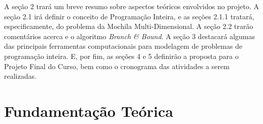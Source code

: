 \documentclass[a4paper,10pt]{article}
\newcommand{\fw}[1]{\emph{#1}}
\begin{document}
% 

A seção 2 trará um breve resumo sobre aspectos teóricos envolvidos no projeto.
A seção 2.1 irá definir o conceito de Programação Inteira, e as seções 2.1.1
tratará, especificamente, do problema da Mochila Multi-Dimensional. A seção 2.2
trarão comentários acerca  e o algoritmo \fw{Branch \& Bound}. A seção 3 destacará
algumas das principais
ferramentas computacionais para modelagem de problemas de programação inteira.
E, por fim, as seções 4 e 5 definirão a proposta para o Projeto Final do Curso,
bem como o cronograma das atividades a serem realizadas.

\section{Fundamentação Teórica}
\label{sec:teoria}
\end{document}
